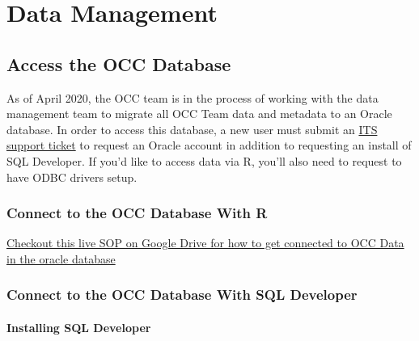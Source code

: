 \documentclass[
]{book}
\begin{document}
\hypertarget{part-data-management}{%
\part*{Data Management}\label{part-data-management}}

\hypertarget{access-the-occ-database}{%
\chapter{Access the OCC Database}\label{access-the-occ-database}}

As of April 2020, the OCC team is in the process of working with the data management team to migrate all OCC Team data and metadata to an Oracle database. In order to access this database, a new user must submit an \href{https://www.st.nmfs.noaa.gov/jira/login.jsp?permissionViolation=true\&os_destination=\%2Fbrowse\%2FPICITS-181121\%3Ffilter\%3D-2\&page_caps=\&user_role=}{ITS support ticket} to request an Oracle account in addition to requesting an install of SQL Developer. If you'd like to access data via R, you'll also need to request to have ODBC drivers setup.

\hypertarget{connect-to-the-occ-database-with-r}{%
\section{Connect to the OCC Database With R}\label{connect-to-the-occ-database-with-r}}

\href{https://docs.google.com/document/d/19hVuyRj78kB3NHR4xF-mWZeOZCwYMDNSLSwQc08Af7s/edit\#}{Checkout this live SOP on Google Drive for how to get connected to OCC Data in the oracle database}

\hypertarget{connect-to-the-occ-database-with-sql-developer}{%
\section{Connect to the OCC Database With SQL Developer}\label{connect-to-the-occ-database-with-sql-developer}}

\hypertarget{installing-sql-developer}{%
\subsection{Installing SQL Developer}\label{installing-sql-developer}}
\end{document}
